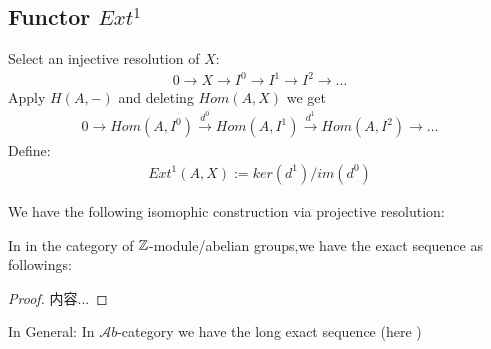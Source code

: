 \documentclass[Total.tex]{subfiles}
\begin{document}
			\subsection{Functor $Ext^1$}
			\begin{Def}
				Select an injective resolution of $X$:
				\begin{gather*}
					0\rightarrow X\rightarrow I^0\rightarrow I^1\rightarrow I^2\rightarrow\dots
				\end{gather*}
				Apply $H(A,-)$ and deleting $Hom(A,X)$ we get
				\begin{gather*}
					0\rightarrow Hom(A,I^0)\stackrel{d^0}{\rightarrow} Hom(A,I^1)\stackrel{d^1}{\rightarrow} Hom(A,I^2)\rightarrow \dots
				\end{gather*}
				Define:
				\begin{gather*}
					Ext^1(A,X):=ker(d^1)/im(d^0)
				\end{gather*}
			\end{Def}
			We have the following isomophic construction via projective resolution:
			\begin{proposition}
				In in the category of $\mathbb{Z}$-module/abelian groups,we have the exact sequence as followings:
				\begin{center}
				\end{center}
			\end{proposition}
			\begin{proof}
				内容...
			\end{proof}
			In General: In $\mathcal Ab$-category we have the long exact sequence (here ) 
\end{document}
